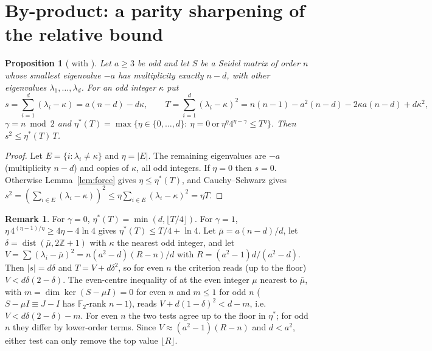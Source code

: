 \documentclass[11pt]{article}
\newtheorem{proposition}[theorem]{Proposition}
\theoremstyle{definition}
\newtheorem{remark}[theorem]{Remark}
\newcommand{\Z}{\mathbb{Z}}
\newcommand{\F}{\mathbb{F}}
\begin{document}
\section{By-product: a parity sharpening of the relative bound}\label{sec:U}

\begin{proposition}[{\cite[Lemma~3.1]{GSY21} with \cite[Thm.~5.6]{GKMS16}}]\label{prop:U}
Let $a\ge3$ be odd and let $S$ be a Seidel matrix of order $n$ whose smallest eigenvalue $-a$ has
multiplicity exactly $n-d$, with other eigenvalues $\lambda_1,\dots,\lambda_d$. For an odd integer
$\kappa$ put
\[
s=\sum_{i=1}^d(\lambda_i-\kappa)=a(n-d)-d\kappa,\qquad
T=\sum_{i=1}^d(\lambda_i-\kappa)^2=n(n-1)-a^2(n-d)-2\kappa a(n-d)+d\kappa^2,
\]
$\gamma=n\bmod2$ and
$\eta^*(T)=\max\{\eta\in\{0,\dots,d\}:\ \eta=0\ \text{or}\ \eta^\eta4^{\eta-\gamma}\le T^\eta\}$. Then
$s^2\le\eta^*(T)\,T$.
\end{proposition}
\begin{proof}
Let $E=\{i:\lambda_i\ne\kappa\}$ and $\eta=|E|$. The remaining eigenvalues are $-a$ (multiplicity $n-d$)
and copies of $\kappa$, all odd integers. If $\eta=0$ then $s=0$. Otherwise Lemma~\ref{lem:force} gives
$\eta\le\eta^*(T)$, and Cauchy--Schwarz gives
$s^2=(\sum_{i\in E}(\lambda_i-\kappa))^2\le\eta\sum_{i\in E}(\lambda_i-\kappa)^2=\eta T$.
\end{proof}

\begin{remark}
For $\gamma=0$, $\eta^*(T)=\min(d,\lfloor T/4\rfloor)$. For $\gamma=1$,
$\eta\,4^{(\eta-1)/\eta}\ge4\eta-4\ln4$ gives $\eta^*(T)\le T/4+\ln4$. Let $\bar\mu=a(n-d)/d$, let
$\delta=\operatorname{dist}(\bar\mu,2\Z+1)$ with $\kappa$ the nearest odd integer, and let
$V=\sum(\lambda_i-\bar\mu)^2=n(a^2-d)(R-n)/d$ with $R=(a^2-1)d/(a^2-d)$. Then $|s|=d\delta$ and
$T=V+d\delta^2$, so for even $n$ the criterion reads (up to the floor) $V<d\delta(2-\delta)$. The
even-centre inequality of \cite[Thm.~5.21]{GKMS16} at the even integer $\mu$ nearest to $\bar\mu$,
with $m=\dim\ker(S-\mu I)=0$ for even $n$ \cite[Cor.~3.6]{GKMS16} and $m\le1$ for odd $n$
($S-\mu I\equiv J-I$ has $\F_2$-rank $n-1$), reads $V+d(1-\delta)^2<d-m$, i.e.\ $V<d\delta(2-\delta)-m$.
For even $n$ the two tests agree up to the floor in $\eta^*$; for odd $n$ they differ by lower-order
terms. Since $V\approx(a^2-1)(R-n)$ and $d<a^2$, either test can only remove the top value
$\lfloor R\rfloor$.
\end{remark}
\end{document}

